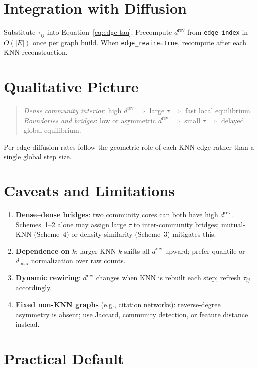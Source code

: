 \documentclass[11pt,a4paper]{report}
\begin{document}
\section{Integration with Diffusion}

Substitute $\tau_{ij}$ into Equation~\eqref{eq:edge-tau}. Precompute $d^{\mathrm{rev}}$ from \texttt{edge\_index} in $O(|E|)$ once per graph build. When \texttt{edge\_rewire=True}, recompute after each KNN reconstruction.

\section{Qualitative Picture}

\begin{quote}
\emph{Dense community interior}: high $d^{\mathrm{rev}}$ $\Rightarrow$ large $\tau$ $\Rightarrow$ fast local equilibrium.\\
\emph{Boundaries and bridges}: low or asymmetric $d^{\mathrm{rev}}$ $\Rightarrow$ small $\tau$ $\Rightarrow$ delayed global equilibrium.
\end{quote}

Per-edge diffusion rates follow the geometric role of each KNN edge rather than a single global step size.

\section{Caveats and Limitations}

\begin{enumerate}
    \item \textbf{Dense--dense bridges}: two community cores can both have high $d^{\mathrm{rev}}$. Schemes~1--2 alone may assign large $\tau$ to inter-community bridges; mutual-KNN (Scheme~4) or density-similarity (Scheme~3) mitigates this.
    \item \textbf{Dependence on $k$}: larger KNN $k$ shifts all $d^{\mathrm{rev}}$ upward; prefer quantile or $d_{\max}$ normalization over raw counts.
    \item \textbf{Dynamic rewiring}: $d^{\mathrm{rev}}$ changes when KNN is rebuilt each step; refresh $\tau_{ij}$ accordingly.
    \item \textbf{Fixed non-KNN graphs} (e.g., citation networks): reverse-degree asymmetry is absent; use Jaccard, community detection, or feature distance instead.
\end{enumerate}

\section{Practical Default}
\end{document}
